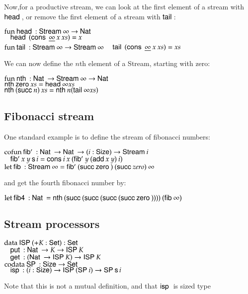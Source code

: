 Now,for a productive stream, we can look at the first element of a stream with $\head$, or remove the first element of a stream with $\tail$:
\begin{bsp}
$\fun \head : \Stream \infty \ra \Nat$\\
$\spc \head \: (\cons \: \inacc{\infty} \: x \: xs) = x$
\vs\\
$\fun \tail :  \Stream \infty \ra \Stream \infty $
$\spc \tail \: (\cons \: \inacc{\infty} \: x \: xs) = xs$\\
\end{bsp}
We can now define the $n$th element of a Stream, starting with zero:
\begin{bsp}
$\fun \nth : \Nat \ra \Stream \infty \ra \Nat$\\
$\nth \zero xs = \head \infty xs$\\
$\nth (\suc n) \: xs = \nth n (\tail \infty xs)$\\
\end{bsp}
\subsection{Fibonacci stream}

One standard example is to define the stream of fibonacci numbers:
\begin{bsp}
$\cofun \fibs : \Nat \ra \Nat \ra \EPi{i}{\Size}{\Stream i}$\\
$\spc  \fibs x \: y \: \s i = \cons i \: x \: (\fibs y \: (\add x \: y) \: i)$\\

$\clet \fib : \Stream \infty = \fibs (\suc \zero) \: (\suc zero) \: \infty$
\end{bsp}
and get the fourth fibonacci number by:
\begin{bsp}
$\clet \fibf : \Nat = \nth (\suc (\suc (\suc (\suc \zero )))) \: (\fib \infty)$
\end{bsp}
\subsection{Stream processors}
\begin{bsp}
$\data \ispd (+ K : \Set ) : \Set$\\
$\spc\putd : \Nat \ra K \ra \ispd K$\\
$\spc \getd : (\Nat \ra \ispd K) \ra \ispd K$\\ 
$\codata \spd : \Size \ra \Set$\\
$\spc \isp : (i : \Size ) \ra \ispd (\spd i) \ra \spd \s i$\\
\end{bsp}
Note that this is not a mutual definition, and that $\isp$ is sized type

